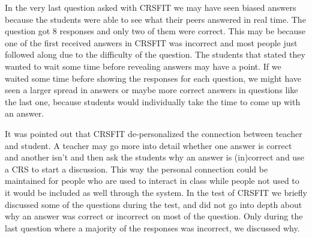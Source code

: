 

In the very last question asked with CRSFIT we may have seen biased answers because the students were able to see what their peers answered in real time. The question got 8 responses and only two of them were correct. This may be because one of the first received answers in CRSFIT was incorrect and most people just followed along due to the difficulty of the question. The students that stated they wanted to wait some time before revealing answers may have a point. If we waited some time before showing the responses for each question, we might have seen a larger spread in answers or maybe more correct answers in questions like the last one, because students would individually take the time to come up with an answer. 



It was pointed out that CRSFIT de-personalized the connection between teacher and student. A teacher may go more into detail whether one answer is correct and another isn't and then ask the students why an answer is (in)correct and use a CRS to start a discussion. This way the personal connection could be maintained for people who are used to interact in class while people not used to it would be included as well through the system. In the test of CRSFIT we briefly discussed some of the questions during the test, and did not go into depth about why an answer was correct or incorrect on most of the question. Only during the last question where a majority of the responses was incorrect, we discussed why.






